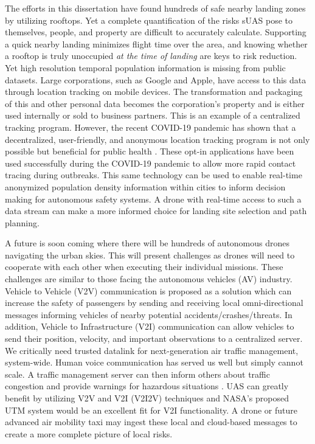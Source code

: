 The efforts in this dissertation have found hundreds of safe nearby landing zones by utilizing rooftops. Yet a complete quantification of the risks \ac{sUAS} pose to themselves, people, and property are difficult to accurately calculate. Supporting a quick nearby landing minimizes flight time over the area, and knowing whether a rooftop is truly unoccupied \emph{at the time of landing} are keys to risk reduction. Yet high resolution temporal population information is missing from public datasets. Large corporations, such as Google and Apple, have access to this data through location tracking on mobile devices. The transformation and packaging of this and other personal data becomes the corporation's property and is either used internally or sold to business partners. This is an example of a centralized tracking program. However, the recent COVID-19 pandemic has shown that a decentralized, user-friendly, and anonymous location tracking program is not only possible but beneficial for public health \cite{cohen_digital_2020, lee_benefits_2021}. These opt-in applications have been used successfully during the COVID-19 pandemic to allow more rapid contact tracing during outbreaks. This same technology can be used to enable real-time anonymized population density information within cities to inform decision making for autonomous safety systems. A drone with real-time access to such a data stream can make a more informed choice for landing site selection and path planning.

A future is soon coming where there will be hundreds of autonomous drones navigating the urban skies. This will present challenges as drones will need to cooperate with each other when executing their individual missions. These challenges are similar to those facing the autonomous vehicles (AV) industry. Vehicle to Vehicle (V2V) communication is proposed as a solution which can increase the safety of passengers by sending and receiving local omni-directional messages informing vehicles of nearby potential accidents/crashes/threats. In addition, Vehicle to Infrastructure (V2I) communication can allow vehicles to send their position, velocity, and important observations to a centralized server. We critically need trusted datalink for next-generation air traffic management, system-wide.  Human voice communication has served us well but simply cannot scale.  A traffic management server can then inform others about traffic congestion and provide warnings for hazardous situations \cite{chitanvis_collision_2019}. \ac{UAS} can greatly benefit by utilizing V2V and V2I (V2I2V) techniques and NASA's proposed \acf{UTM} system would be an excellent fit for V2I functionality. A drone or future advanced air mobility taxi may ingest these local and cloud-based messages to create a more complete picture of local risks. 




